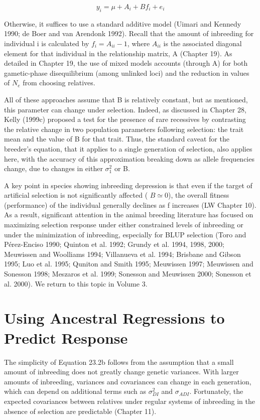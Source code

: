 \documentclass{article}
\begin{document}
\begin{equation}
y_{i}=\mu+A_{i}+B f_{i}+e_{i}
\tag{23.2c}
\label{eq:23_2c}
\end{equation}

Otherwise, it suffices to use a standard additive model (Uimari and Kennedy 1990; de Boer and van Arendonk 1992). Recall that the amount of inbreeding for individual i is calculated by  $ f_i = A_{ii} - 1 $, where  $ A_{ii} $ is the associated diagonal element for that individual in the relationship matrix, A (Chapter 19). As detailed in Chapter 19, the use of mixed models accounts (through A) for both gametic-phase disequilibrium (among unlinked loci) and the reduction in values of  $ N_e $ from choosing relatives.

All of these approaches assume that B is relatively constant, but as mentioned, this parameter can change under selection. Indeed, as discussed in Chapter 28, Kelly (1999c) proposed a test for the presence of rare recessives by contrasting the relative change in two population parameters following selection: the trait mean and the value of B for that trait. Thus, the standard caveat for the breeder's equation, that it applies to a single generation of selection, also applies here, with the accuracy of this approximation breaking down as allele frequencies change, due to changes in either  $ \sigma_{1}^{2} $ or B.

A key point in species showing inbreeding depression is that even if the target of artificial selection is not significantly affected ( $ B \simeq 0 $), the overall fitness (performance) of the individual generally declines as f increases (LW Chapter 10). As a result, significant attention in the animal breeding literature has focused on maximizing selection response under either constrained levels of inbreeding or under the minimization of inbreeding, especially for BLUP selection (Toro and Pérez-Enciso 1990; Quinton et al. 1992; Grundy et al. 1994, 1998, 2000; Meuwissen and Woolliams 1994; Villanueva et al. 1994; Brisbane and Gibson 1995; Luo et al. 1995; Quniton and Smith 1995; Meuwissen 1997; Meuwissen and Sonesson 1998; Meszaros et al. 1999; Sonesson and Meuwissen 2000; Sonesson et al. 2000). We return to this topic in Volume 3.

\section{Using Ancestral Regressions to Predict Response}
The simplicity of Equation 23.2b follows from the assumption that a small amount of inbreeding does not greatly change genetic variances. With larger amounts of inbreeding, variances and covariances can change in each generation, which can depend on additional terms such as  $ \sigma_{DI}^{2} $ and  $ \sigma_{ADI} $. Fortunately, the expected covariances between relatives under regular systems of inbreeding in the absence of selection are predictable (Chapter 11).
\end{document}
